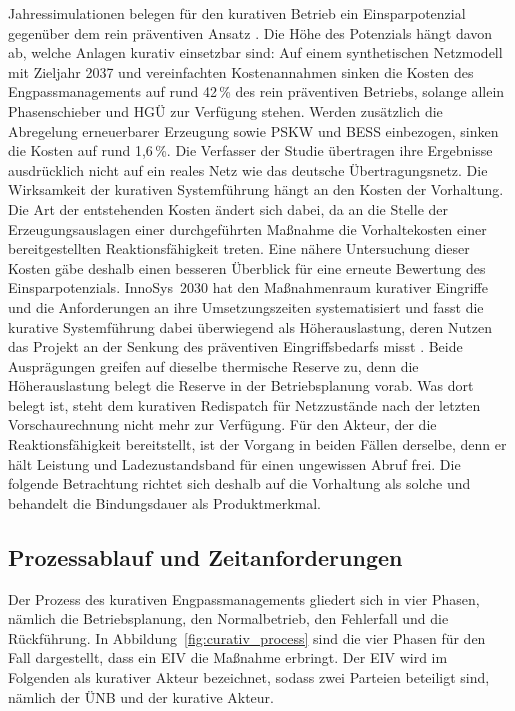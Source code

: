 Jahressimulationen belegen für den kurativen Betrieb ein Einsparpotenzial gegenüber dem rein präventiven Ansatz \cite{sous_comparison_2025}.
Die Höhe des Potenzials hängt davon ab, welche Anlagen kurativ einsetzbar sind: Auf einem synthetischen Netzmodell mit Zieljahr 2037 und vereinfachten Kostenannahmen sinken die Kosten des Engpassmanagements auf rund 42\,\% des rein präventiven Betriebs, solange allein Phasenschieber und \ac{HGÜ} zur Verfügung stehen.
Werden zusätzlich die Abregelung erneuerbarer Erzeugung sowie \ac{PSKW} und \ac{BESS} einbezogen, sinken die Kosten auf rund 1{,}6\,\%.
Die Verfasser der Studie übertragen ihre Ergebnisse ausdrücklich nicht auf ein reales Netz wie das deutsche Übertragungsnetz.
Die Wirksamkeit der kurativen Systemführung hängt an den Kosten der Vorhaltung.
Die Art der entstehenden Kosten ändert sich dabei, da an die Stelle der Erzeugungsauslagen einer durchgeführten Maßnahme die Vorhaltekosten einer bereitgestellten Reaktionsfähigkeit treten.
Eine nähere Untersuchung dieser Kosten gäbe deshalb einen besseren Überblick für eine erneute Bewertung des Einsparpotenzials.
InnoSys~2030 hat den Maßnahmenraum kurativer Eingriffe und die Anforderungen an ihre Umsetzungszeiten systematisiert und fasst die kurative Systemführung dabei überwiegend als Höherauslastung, deren Nutzen das Projekt an der Senkung des präventiven Eingriffsbedarfs misst \cite{innosys_2030_gesamtverbund_innovationen_2021}.
Beide Ausprägungen greifen auf dieselbe thermische Reserve zu, denn die Höherauslastung belegt die Reserve in der Betriebsplanung vorab.
Was dort belegt ist, steht dem kurativen Redispatch für Netzzustände nach der letzten Vorschaurechnung nicht mehr zur Verfügung.
Für den Akteur, der die Reaktionsfähigkeit bereitstellt, ist der Vorgang in beiden Fällen derselbe, denn er hält Leistung und Ladezustandsband für einen ungewissen Abruf frei.
Die folgende Betrachtung richtet sich deshalb auf die Vorhaltung als solche und behandelt die Bindungsdauer als Produktmerkmal.

\subsection{Prozessablauf und Zeitanforderungen}
\label{sec:curative_functionality}

Der Prozess des kurativen Engpassmanagements gliedert sich in vier Phasen, nämlich die Betriebsplanung, den Normalbetrieb, den Fehlerfall und die Rückführung.
In Abbildung~\ref{fig:curativ_process} sind die vier Phasen für den Fall dargestellt, dass ein \ac{EIV} die Maßnahme erbringt.
Der \ac{EIV} wird im Folgenden als kurativer Akteur bezeichnet, sodass zwei Parteien beteiligt sind, nämlich der \ac{ÜNB} und der kurative Akteur.

